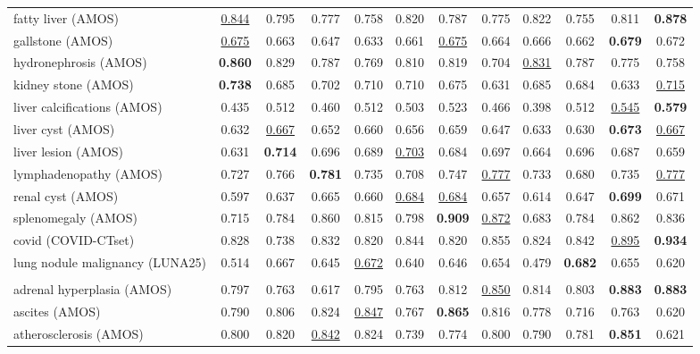 \begin{minipage}{\textwidth}
{\begin{tabular}{@{}lccccccccccc@{}}
fatty liver (AMOS) & \underline{0.844} & 0.795 & 0.777 & 0.758 & 0.820 & 0.787 & 0.775 & 0.822 & 0.755 & 0.811 & \textbf{0.878} \\
gallstone (AMOS) & \underline{0.675} & 0.663 & 0.647 & 0.633 & 0.661 & \underline{0.675} & 0.664 & 0.666 & 0.662 & \textbf{0.679} & 0.672 \\
hydronephrosis (AMOS) & \textbf{0.860} & 0.829 & 0.787 & 0.769 & 0.810 & 0.819 & 0.704 & \underline{0.831} & 0.787 & 0.775 & 0.758 \\
kidney stone (AMOS) & \textbf{0.738} & 0.685 & 0.702 & 0.710 & 0.710 & 0.675 & 0.631 & 0.685 & 0.684 & 0.633 & \underline{0.715} \\
liver calcifications (AMOS) & 0.435 & 0.512 & 0.460 & 0.512 & 0.503 & 0.523 & 0.466 & 0.398 & 0.512 & \underline{0.545} & \textbf{0.579} \\
liver cyst (AMOS) & 0.632 & \underline{0.667} & 0.652 & 0.660 & 0.656 & 0.659 & 0.647 & 0.633 & 0.630 & \textbf{0.673} & \underline{0.667} \\
liver lesion (AMOS) & 0.631 & \textbf{0.714} & 0.696 & 0.689 & \underline{0.703} & 0.684 & 0.697 & 0.664 & 0.696 & 0.687 & 0.659 \\
lymphadenopathy (AMOS) & 0.727 & 0.766 & \textbf{0.781} & 0.735 & 0.708 & 0.747 & \underline{0.777} & 0.733 & 0.680 & 0.735 & \underline{0.777} \\
renal cyst (AMOS) & 0.597 & 0.637 & 0.665 & 0.660 & \underline{0.684} & \underline{0.684} & 0.657 & 0.614 & 0.647 & \textbf{0.699} & 0.671 \\
splenomegaly (AMOS) & 0.715 & 0.784 & 0.860 & 0.815 & 0.798 & \textbf{0.909} & \underline{0.872} & 0.683 & 0.784 & 0.862 & 0.836 \\
covid (COVID-CTset) & 0.828 & 0.738 & 0.832 & 0.820 & 0.844 & 0.820 & 0.855 & 0.824 & 0.842 & \underline{0.895} & \textbf{0.934} \\
lung nodule malignancy (LUNA25) & 0.514 & 0.667 & 0.645 & \underline{0.672} & 0.640 & 0.646 & 0.654 & 0.479 & \textbf{0.682} & 0.655 & 0.620 \\
\addlinespace
\multicolumn{12}{@{}l}{\textit{joint (26\,000 steps)}} \\
adrenal hyperplasia (AMOS) & 0.797 & 0.763 & 0.617 & 0.795 & 0.763 & 0.812 & \underline{0.850} & 0.814 & 0.803 & \textbf{0.883} & \textbf{0.883} \\
ascites (AMOS) & 0.790 & 0.806 & 0.824 & \underline{0.847} & 0.767 & \textbf{0.865} & 0.816 & 0.778 & 0.716 & 0.763 & 0.620 \\
atherosclerosis (AMOS) & 0.800 & 0.820 & \underline{0.842} & 0.824 & 0.739 & 0.774 & 0.800 & 0.790 & 0.781 & \textbf{0.851} & 0.621 \\

\end{tabular}}
\end{minipage}
